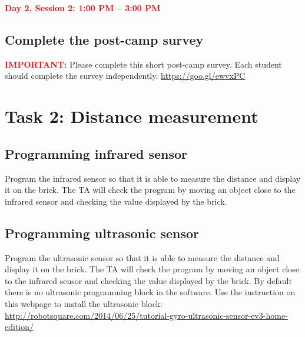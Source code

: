 \documentclass[11pt]{article}
\def\bluehref#1#2{\href{#1}{\color{blue} #2}}
\begin{document}
\vspace{1cm}
\noindent \textcolor{red}{\bf\Large Day 2, Session 2: 1:00 PM -- 3:00 PM} 

\subsection*{Complete the post-camp survey}
\textcolor{red}{\bf IMPORTANT:}
Please complete this short post-camp survey. Each student should complete the survey independently. 
\bluehref{https://goo.gl/ewvxPC}{https://goo.gl/ewvxPC}


\section*{Task 2: Distance measurement} 
\subsection*{Programming infrared sensor} Program the infrared sensor so that it is able to measure the distance and display it on the brick. The TA will check the program by moving an object close to the infrared sensor and checking the value displayed by the brick. 

\subsection*{Programming ultrasonic sensor} Program the ultrasonic sensor so that it is able to measure the distance and display it on the brick. The TA will check the program by moving an object close to the infrared sensor and checking the value displayed by the brick. By default there is no ultrasonic programming block in the software. Use the instruction on this webpage to install the ultrasonic block: \\
\bluehref{http://robotsquare.com/2014/06/25/tutorial-gyro-ultrasonic-sensor-ev3-home-edition/}{http://robotsquare.com/2014/06/25/tutorial-gyro-ultrasonic-sensor-ev3-home-edition/}
\end{document}
